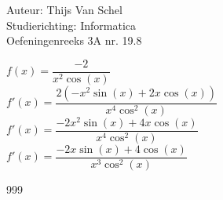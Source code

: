 \documentclass[a4paper]{article}
\begin{document}
  
\noindent \large Auteur: Thijs Van Schel \\
\noindent \large Studierichting: Informatica\\
\noindent \large Oefeningenreeks 3A nr. 19.8\\

\medskip

\normalsize

$f(x) = \dfrac{-2}{x^2\cos(x)}$ \\

$f'(x) = \dfrac{2(-x^2\sin(x)+2x\cos(x))}{x^4\cos^2(x)}$ \\

$f'(x) = \dfrac{-2x^2\sin(x)+4x\cos(x)}{x^4\cos^2(x)}$ \\

$f'(x) = \dfrac{-2x\sin(x)+4\cos(x)}{x^3\cos^2(x)}$

\begin{thebibliography}{999}
\end{thebibliography}
\end{document}
